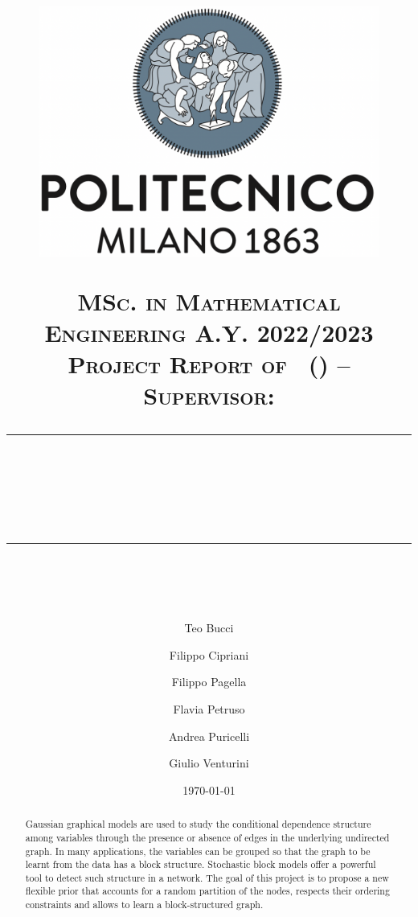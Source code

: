 \documentclass{article}
\title{
    \begin{figure}[htpb]
        \centering
        \includegraphics[scale=0.2]{images/logo-polimi}
    \end{figure}
    \normalfont \normalsize 
    \textsc{MSc. in Mathematical Engineering A.Y. 2022/2023\\ 
    Project Report of \coursename\ (\coursecode) -- \courseprof \\
    Supervisor: \coursesupervisor} \\
    [10pt] 
    \rule{\linewidth}{0.5pt} \\ [6pt] 
    \huge \papertitle \\
    \rule{\linewidth}{2pt}  \\ [10pt]
}
\author[1]{Teo Bucci}
\author[2]{Filippo Cipriani}
\author[3]{Filippo Pagella}
\author[4]{Flavia Petruso}
\author[5]{Andrea Puricelli}
\author[6]{Giulio Venturini}
\affil[1]{10621873}
\affil[2]{10596877}
\affil[3]{10616351}
\affil[4]{10544566}
\affil[5]{10632135}
\affil[6]{10624098}
\date{\normalsize \today}
\begin{document}
\maketitle


\begin{abstract} %
Gaussian graphical models are used to study the conditional dependence structure among variables through the presence or absence of edges in the underlying undirected graph. In many applications, the variables can be grouped so that the graph to be learnt from the data has a block structure. Stochastic block models offer a powerful tool to detect such structure in a network. The goal of this project is to propose a new flexible prior that accounts for a random partition of the nodes, respects their ordering constraints and allows to learn a block-structured graph.
\end{abstract}

\clearpage

\tableofcontents

    


% 

\nocite{*}
\printbibliography
\end{document}
